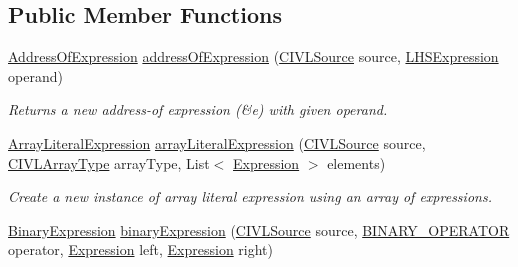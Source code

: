 \subsection*{Public Member Functions}
\begin{DoxyCompactItemize}
\item 
\hyperlink{interfaceedu_1_1udel_1_1cis_1_1vsl_1_1civl_1_1model_1_1IF_1_1expression_1_1AddressOfExpression}{Address\+Of\+Expression} \hyperlink{interfaceedu_1_1udel_1_1cis_1_1vsl_1_1civl_1_1model_1_1IF_1_1ModelFactory_a909b6fc411af8e3b029992d227e5ae1a}{address\+Of\+Expression} (\hyperlink{interfaceedu_1_1udel_1_1cis_1_1vsl_1_1civl_1_1model_1_1IF_1_1CIVLSource}{C\+I\+V\+L\+Source} source, \hyperlink{interfaceedu_1_1udel_1_1cis_1_1vsl_1_1civl_1_1model_1_1IF_1_1expression_1_1LHSExpression}{L\+H\+S\+Expression} operand)
\begin{DoxyCompactList}\small\item\em Returns a new address-\/of expression {\ttfamily (\&e)} with given operand. \end{DoxyCompactList}\item 
\hyperlink{interfaceedu_1_1udel_1_1cis_1_1vsl_1_1civl_1_1model_1_1IF_1_1expression_1_1ArrayLiteralExpression}{Array\+Literal\+Expression} \hyperlink{interfaceedu_1_1udel_1_1cis_1_1vsl_1_1civl_1_1model_1_1IF_1_1ModelFactory_a0fadd769aa8749b758e036322b45b958}{array\+Literal\+Expression} (\hyperlink{interfaceedu_1_1udel_1_1cis_1_1vsl_1_1civl_1_1model_1_1IF_1_1CIVLSource}{C\+I\+V\+L\+Source} source, \hyperlink{interfaceedu_1_1udel_1_1cis_1_1vsl_1_1civl_1_1model_1_1IF_1_1type_1_1CIVLArrayType}{C\+I\+V\+L\+Array\+Type} array\+Type, List$<$ \hyperlink{interfaceedu_1_1udel_1_1cis_1_1vsl_1_1civl_1_1model_1_1IF_1_1expression_1_1Expression}{Expression} $>$ elements)
\begin{DoxyCompactList}\small\item\em Create a new instance of array literal expression using an array of expressions. \end{DoxyCompactList}\item 
\hyperlink{interfaceedu_1_1udel_1_1cis_1_1vsl_1_1civl_1_1model_1_1IF_1_1expression_1_1BinaryExpression}{Binary\+Expression} \hyperlink{interfaceedu_1_1udel_1_1cis_1_1vsl_1_1civl_1_1model_1_1IF_1_1ModelFactory_a0c03f1ccf61074da649951e75e6c26ff}{binary\+Expression} (\hyperlink{interfaceedu_1_1udel_1_1cis_1_1vsl_1_1civl_1_1model_1_1IF_1_1CIVLSource}{C\+I\+V\+L\+Source} source, \hyperlink{enumedu_1_1udel_1_1cis_1_1vsl_1_1civl_1_1model_1_1IF_1_1expression_1_1BinaryExpression_1_1BINARY__OPERATOR}{B\+I\+N\+A\+R\+Y\+\_\+\+O\+P\+E\+R\+A\+T\+O\+R} operator, \hyperlink{interfaceedu_1_1udel_1_1cis_1_1vsl_1_1civl_1_1model_1_1IF_1_1expression_1_1Expression}{Expression} left, \hyperlink{interfaceedu_1_1udel_1_1cis_1_1vsl_1_1civl_1_1model_1_1IF_1_1expression_1_1Expression}{Expression} right)

\end{DoxyCompactItemize}
